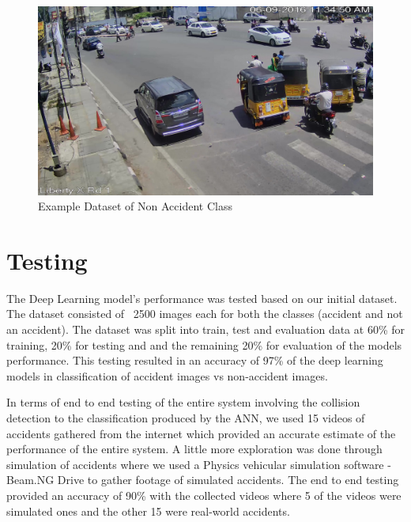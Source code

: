 \documentclass[ 12pt,a4paper,twocolumn,fleqn]{article}
\begin{document}
\begin{adjustwidth}{3.5em}{0pt}
\begin{figure}[H]
\begin{center}
    \hspace{0.1cm}
\end{center}
\end{figure}
\begin{figure}[H]
\begin{center}
    
    \hspace*{0.4in}
    \includegraphics[scale=0.15]{media/noacc3.jpg}
    
  \caption{ Example Dataset of Non Accident Class}
\end{center}
\end{figure}
\vfill

\newpage
  \pagestyle{fancy}
  
\section{Testing}

The Deep Learning model’s performance was tested based on our initial dataset. The dataset consisted of ~2500 images each for both the classes (accident and not an accident). The dataset was split into train, test and evaluation data at 60\% for training, 20\% for testing and and the remaining 20\% for evaluation of the models performance.
This testing resulted in an accuracy of 97\% of the deep learning models in classification of accident images vs non-accident images.

In terms of end to end testing of the entire system involving the collision detection to the classification produced by the ANN, we used 15 videos of accidents gathered from the internet which provided an accurate estimate of the performance of the entire system.
A little more exploration was done through simulation of accidents where we used a Physics vehicular simulation software - Beam.NG Drive to gather footage of simulated accidents. 
The end to end testing provided an accuracy of 90\% with the collected videos where 5 of the videos were simulated ones and the other 15 were real-world accidents.


\end{adjustwidth}
\end{document}
